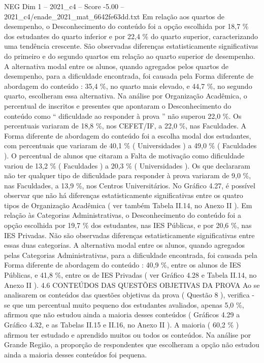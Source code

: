 \begin{textsample}{NEG Dim 1 – 2021\_c4 – Score -5.00 – 2021\_c4/enade\_2021\_mat\_6642fe63dd.txt}
Em relação aos quartos de desempenho, o Desconhecimento do conteúdo foi a opção escolhida por 18,7 \% dos estudantes do quarto inferior e por 22,4 \% do quarto superior, caracterizando uma tendência crescente.
São observadas diferenças estatisticamente significativas do primeiro e do segundo quartos em relação ao quarto superior de desempenho.
A alternativa modal entre os alunos, quando agregados pelos quartos de desempenho, para a dificuldade encontrada, foi causada pela Forma diferente de abordagem do conteúdo : 35,4 \%, no quarto mais elevado, e 44,7 \%, no segundo quarto, escolheram essa alternativa.
Na análise por Organização Acadêmica, o percentual de inscritos e presentes que apontaram o Desconhecimento do conteúdo como “ dificuldade ao responder à prova ” não superou 22,0 \%.
Os percentuais variaram de 18,8 \%, nos CEFET/IF, a 22,0 \%, nas Faculdades.
A Forma diferente de abordagem do conteúdo foi a escolha modal dos estudantes, com percentuais que variaram de 40,1 \% ( Universidades ) a 49,0 \% ( Faculdades ).
O percentual de alunos que citaram a Falta de motivação como dificuldade variou de 13,2 \% ( Faculdades ) a 20,3 \% ( Universidades ).
Os que declararam não ter qualquer tipo de dificuldade para responder à prova variaram de 9,0 \%, nas Faculdades, a 13,9 \%, nos Centros Universitários.
No Gráfico 4.27, é possível observar que não há diferenças estatisticamente significativas entre os quatro tipos de Organização Acadêmica ( ver também Tabela II.14, no Anexo II ).
Em relação às Categorias Administrativas, o Desconhecimento do conteúdo foi a opção escolhida por 19,7 \% dos estudantes, nas IES Públicas, e por 20,6 \%, nas IES Privadas.
Não são observadas diferenças estatisticamente significativas entre essas duas categorias.
A alternativa modal entre os alunos, quando agregados pelas Categorias Administrativas, para a dificuldade encontrada, foi causada pela Forma diferente de abordagem do conteúdo : 40,9 \%, entre os alunos de IES Públicas, e 41,8 \%, entre os de IES Privadas ( ver Gráfico 4.28 e Tabela II.14, no Anexo II ). 4.6 CONTEÚDOS DAS QUESTÕES OBJETIVAS DA PROVA Ao se analisarem os conteúdos das questões objetivas da prova ( Questão 8 ), verifica -se que um percentual muito pequeno dos estudantes avaliados, apenas 5,0 \%, afirmou que não estudou ainda a maioria desses conteúdos ( Gráficos 4.29 a Gráfico 4.32, e as Tabelas II.15 e II.16, no Anexo II ).
A maioria ( 60,2 \% ) afirmou ter estudado e aprendido muitos ou todos os conteúdos.
Na análise por Grande Região, a proporção de respondentes que escolheram a opção não estudou ainda a maioria desses conteúdos foi pequena.

\end{textsample}
